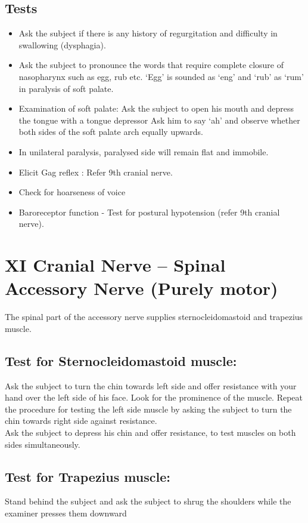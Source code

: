 \documentclass[a4paper,12pt,openany,twoside]{book}
\begin{document}
\subsection*{Tests}
\begin{itemize}
\item[]Ask the subject if there is any history of regurgitation and difficulty in swallowing (dysphagia).
\item[]Ask the subject to pronounce the words that require complete closure of nasopharynx such as egg, rub etc. ‘Egg’ is sounded as ‘eng’ and ‘rub’ as ‘rum’ in paralysis of soft palate.
\item[]Examination of soft palate: Ask the subject to open his mouth and depress the tongue with a tongue depressor Ask him to say ‘ah’ and observe whether both sides of the soft palate arch equally upwards.
\item[]In unilateral paralysis, paralysed side will remain flat and immobile.
\item[]Elicit Gag reflex : Refer 9th cranial nerve.
\item[]Check for hoarseness of voice
\item[]Baroreceptor function - Test for postural hypotension (refer 9th cranial nerve).
\end{itemize}
\section*{XI Cranial Nerve – Spinal Accessory Nerve (Purely motor) }
The spinal part of the accessory nerve supplies sternocleidomastoid and trapezius muscle.

\subsection*{Test for Sternocleidomastoid muscle:}
Ask the subject to turn the chin towards left side and offer resistance with your hand over the left side of his face. Look for the prominence of the muscle. Repeat the procedure for testing the left side muscle by asking the subject to turn the chin towards right side against resistance.\\
Ask the subject to depress his chin and offer resistance, to test muscles on both sides simultaneously.

\subsection*{Test for Trapezius muscle:}
Stand behind the subject and ask the subject to shrug the shoulders while the examiner presses them downward
\end{document}
